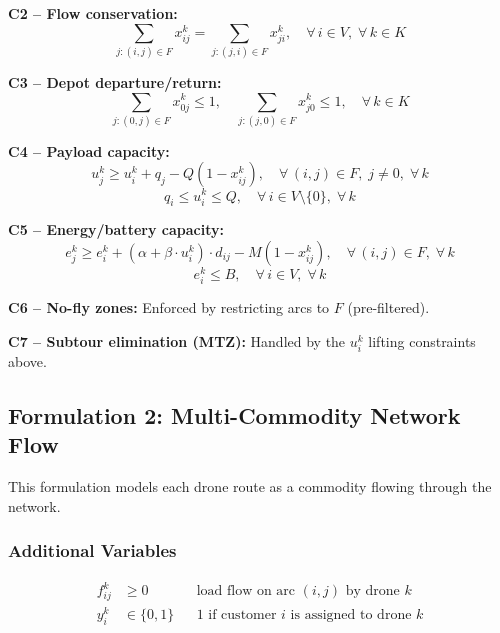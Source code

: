 \documentclass[12pt,a4paper]{article}
\begin{document}
\textbf{C2 -- Flow conservation:}
\begin{equation}
\sum_{j:(i,j)\in F} x_{ij}^k = \sum_{j:(j,i)\in F} x_{ji}^k, \quad \forall\, i\in V,\; \forall\, k\in K
\end{equation}

\textbf{C3 -- Depot departure/return:}
\begin{equation}
\sum_{j:(0,j)\in F} x_{0j}^k \leq 1,\quad \sum_{j:(j,0)\in F} x_{j0}^k \leq 1, \quad \forall\, k\in K
\end{equation}

\textbf{C4 -- Payload capacity:}
\begin{equation}
u_j^k \geq u_i^k + q_j - Q(1-x_{ij}^k), \quad \forall\, (i,j)\in F,\; j\neq 0,\; \forall\, k
\end{equation}
\begin{equation}
q_i \leq u_i^k \leq Q, \quad \forall\, i\in V\setminus\{0\},\; \forall\, k
\end{equation}

\textbf{C5 -- Energy/battery capacity:}
\begin{equation}
e_j^k \geq e_i^k + (\alpha+\beta\cdot u_i^k)\cdot d_{ij} - M(1-x_{ij}^k), \quad \forall\, (i,j)\in F,\; \forall\, k
\end{equation}
\begin{equation}
e_i^k \leq B, \quad \forall\, i\in V,\; \forall\, k
\end{equation}

\textbf{C6 -- No-fly zones:} Enforced by restricting arcs to $F$ (pre-filtered).

\textbf{C7 -- Subtour elimination (MTZ):}
Handled by the $u_i^k$ lifting constraints above.

\subsection{Formulation 2: Multi-Commodity Network Flow}

This formulation models each drone route as a commodity flowing through the network.

\subsubsection{Additional Variables}
\begin{align}
f_{ij}^k &\geq 0 && \text{load flow on arc $(i,j)$ by drone $k$} \\
y_i^k &\in \{0,1\} && \text{1 if customer $i$ is assigned to drone $k$}
\end{align}
\end{document}
